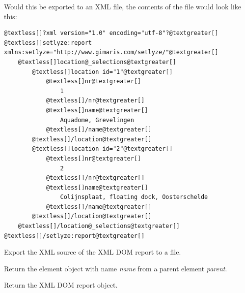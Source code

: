 \documentclass[letterpaper,10pt,english]{sphinxmanual}
\begin{document}
\begin{fulllineitems}
\begin{fulllineitems}
Would this be exported to an XML file, the contents of the file
would look like this:

\begin{Verbatim}[commandchars=@\[\]]
@textless[]?xml version="1.0" encoding="utf-8"?@textgreater[]
@textless[]setlyze:report xmlns:setlyze="http://www.gimaris.com/setlyze/"@textgreater[]
    @textless[]location@_selections@textgreater[]
        @textless[]location id="1"@textgreater[]
            @textless[]nr@textgreater[]
                1
            @textless[]/nr@textgreater[]
            @textless[]name@textgreater[]
                Aquadome, Grevelingen
            @textless[]/name@textgreater[]
        @textless[]/location@textgreater[]
        @textless[]location id="2"@textgreater[]
            @textless[]nr@textgreater[]
                2
            @textless[]/nr@textgreater[]
            @textless[]name@textgreater[]
                Colijnsplaat, floating dock, Oosterschelde
            @textless[]/name@textgreater[]
        @textless[]/location@textgreater[]
    @textless[]/location@_selections@textgreater[]
@textless[]/setlyze:report@textgreater[]
\end{Verbatim}

\end{fulllineitems}


\begin{fulllineitems}
\label{setlyze/std:setlyze.std.ReportGenerator.export_xml}
Export the XML source of the XML DOM report to a file.

\end{fulllineitems}


\begin{fulllineitems}
\label{setlyze/std:setlyze.std.ReportGenerator.get_element}
Return the element object with name \emph{name} from a parent
element \emph{parent}.

\end{fulllineitems}


\begin{fulllineitems}
\label{setlyze/std:setlyze.std.ReportGenerator.get_report}
Return the XML DOM report object.


\end{fulllineitems}
\end{fulllineitems}
\end{document}
